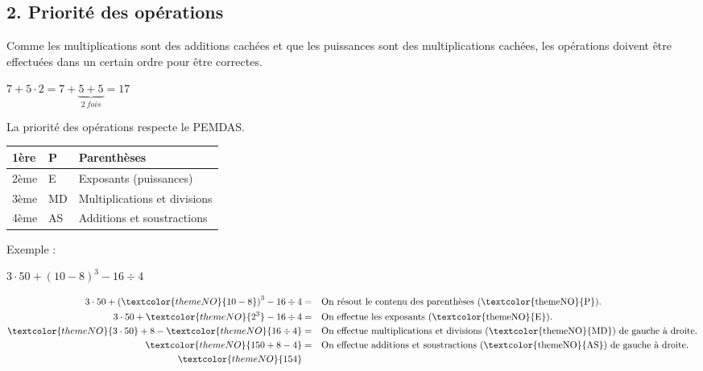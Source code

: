 \vfill
\subsection*{2. Priorité des opérations}

Comme les multiplications sont des additions cachées et que les puissances sont des multiplications cachées, les opérations doivent être effectuées dans un certain ordre pour être correctes.

\begin{center}
$7+5\cdot 2=7+\underset{2\ fois}{\underbrace{5+5}}=17$
\end{center}

La priorité des opérations respecte le \textcolor{themeNO}{PEMDAS}.

\def\arraystretch{1.6}
\begin{tabularx}{\linewidth}{|p{2cm}|>{\centering\arraybackslash}p{2cm}|X|}
\hline
1ère & \textcolor{themeNO}{P} & Parenthèses\\\hline
2ème & \textcolor{themeNO}{E} & Exposants (puissances)\\\hline
3ème & \textcolor{themeNO}{MD} & Multiplications et divisions\\\hline
4ème & \textcolor{themeNO}{AS} & Additions et soustractions\\\hline
\end{tabularx}
\def\arraystretch{1}

\newpage
Exemple :

\vspace{-10pt}\begin{center}$3\cdot 50+\left(10-8\right)^3-16\div4$\end{center}

\vspace{-30pt}\begin{align*}
3\cdot 50+\left(\textcolor{themeNO}{10-8}\right)^3-16\div4&=&&\text{On résout le contenu des parenthèses (\textcolor{themeNO}{P}).}\\
3\cdot 50+\textcolor{themeNO}{2^3}-16\div4&=   &&\text{On effectue les exposants (\textcolor{themeNO}{E}).}\\
\textcolor{themeNO}{3\cdot 50}+8-\textcolor{themeNO}{16\div4}&=&&\text{On effectue multiplications et divisions (\textcolor{themeNO}{MD}) de gauche à droite.}\\
\textcolor{themeNO}{150+8-4}&=&&\text{On effectue additions et soustractions (\textcolor{themeNO}{AS}) de gauche à droite.}\\
\textcolor{themeNO}{154}&&&
\end{align*}

